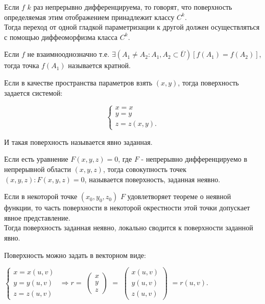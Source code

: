 \opred

Если $f$ $k$ раз непрерывно дифференцируема, то говорят, что поверхность определяемая этим отображением принадлежит классу $C^k$. 
\\
Тогда переход от одной гладкой параметризации к другой должен осуществляться с помощью диффеоморфизма класса $C^k$.

\opred

Если $f$ не взаимнооднозначно т.е. $\exists (A_1 \neq A_2 : A_1, A_2 \subset \overline{U})[f(A_1) = f(A_2)]$, тогда точка $f(A_1)$ называется кратной.

\opred

Если в качестве пространства параметров взять $(x,y)$, тогда поверхность задается системой:

\begin{equation*}
 \begin{cases}
   x =x 
   \\
   y = y
   \\
   z = z(x,y).
 \end{cases}
\end{equation*}

И такая поверхность называется явно заданная.

\opred

Если есть уравнение $F(x,y,z)=0$, где $F$ - непрерывно дифференцируемо в непрерывной области $(x,y,z)$, тогда совокупность точек $(x,y,z) : F(x,y,z)=0$, называется поверхность, заданная неявно.

\opred

Если в некоторой точке $(x_0,y_0,z_0)$ $F$ удовлетворяет теореме о неявной функции, то часть поверхности в некоторой окрестности этой точки допускает явное представление.
\\
Тогда поверхность заданная неявно, локально сводится к поверхности заданной явно.

Поверхность можно задать в векторном виде:

$\left\{
  \begin{array}{ccc}
x = x(u,v) 
\\
y = y(u,v) 
\\
z = z(u,v) 
  \end{array}
\right.$
$\Rightarrow r = $
$\left(
  \begin{array}{ccc}
x 
\\
y 
\\
z 
  \end{array}
\right)
$
$=$
$\left(
  \begin{array}{ccc}
x(u,v) 
\\
y(u,v) 
\\
z(u,v) 
  \end{array}
\right)$
$= r(u,v)$.